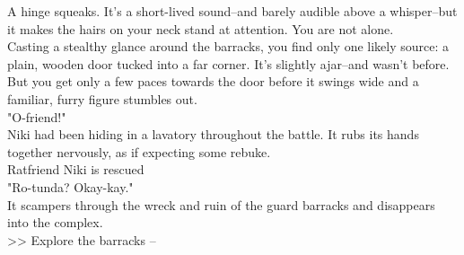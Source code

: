 A hinge squeaks. It's a short-lived sound--and barely audible above a whisper--but it makes the hairs on your neck stand at attention. You are not alone.\\

Casting a stealthy glance around the barracks, you find only one likely source: a plain, wooden door tucked into a far corner. It's slightly ajar--and wasn't before.\\

But you get only a few paces towards the door before it swings wide and a familiar, furry figure stumbles out.\\

"O-friend!"\\

Niki had been hiding in a lavatory throughout the battle. It rubs its hands together nervously, as if expecting some rebuke.\\
 Ratfriend Niki is rescued\\

"Ro-tunda? Okay-kay."\\

It scampers through the wreck and ruin of the guard barracks and disappears into the complex.\\

>> Explore the barracks -- 